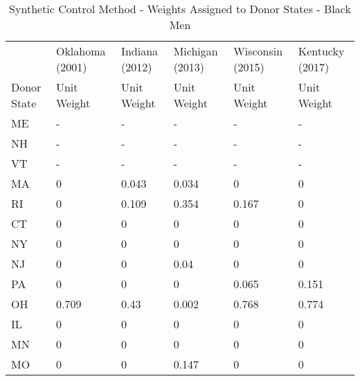 \begin{table}[ht!]\centering
\caption{Synthetic Control Method - Weights Assigned to Donor States - Black Men}\label{tab:donor_weights_bm}
\fontsize{10}{11}\selectfont
\begin{tabular}{llllll}
            &                 &                &                 &                  &                 \\
            \hline
            \hline
            & Oklahoma (2001) & Indiana (2012) & Michigan (2013) & Wisconsin (2015) & Kentucky (2017) \\
            \hline
Donor State & Unit Weight     & Unit Weight    & Unit Weight     & Unit Weight      & Unit Weight     \\
            \hline
ME          & -               & -              & -               & -                & -               \\
NH          & -               & -              & -               & -                & -               \\
VT          & -               & -              & -               & -                & -               \\
MA          & 0               & 0.043          & 0.034           & 0                & 0               \\
RI          & 0               & 0.109          & 0.354           & 0.167            & 0               \\
CT          & 0               & 0              & 0               & 0                & 0               \\
NY          & 0               & 0              & 0               & 0                & 0               \\
NJ          & 0               & 0              & 0.04            & 0                & 0               \\
PA          & 0               & 0              & 0               & 0.065            & 0.151           \\
OH          & 0.709           & 0.43           & 0.002           & 0.768            & 0.774           \\
IL          & 0               & 0              & 0               & 0                & 0               \\
MN          & 0               & 0              & 0               & 0                & 0               \\
MO          & 0               & 0              & 0.147           & 0                & 0               \\

\end{tabular}
\end{table}
